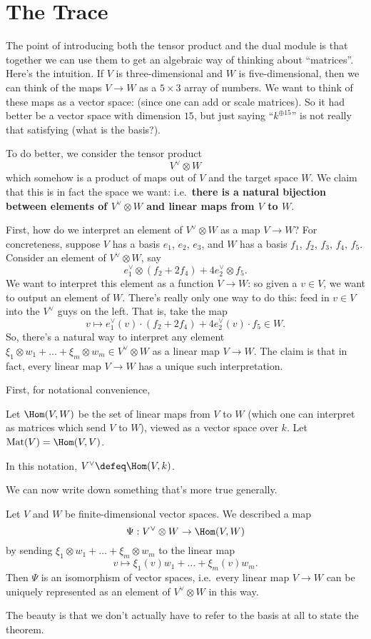 \section{The Trace}
The point of introducing both the tensor product and the dual module is that together
we can use them to get an algebraic way of thinking about ``matrices''.
Here's the intuition.
If $V$ is three-dimensional and $W$ is five-dimensional, then we can think
of the maps $V \to W$ as a $5 \times 3$ array of numbers.
We want to think of these maps as a vector space:
(since one can add or scale matrices).
So it had better be a vector space with dimension $15$,
but just saying ``$k^{\oplus 15}$'' is not really that satisfying
(what is the basis?).

To do better, we consider the tensor product \[ V^\vee \otimes W \]
which somehow is a product of maps out of $V$ and the target space $W$.
We claim that this is in fact the space we want:
i.e.\ \textbf{there is a natural bijection between elements of $V^\vee \otimes W$
and linear maps from $V$ to $W$}.

First, how do we interpret an element of $V^\vee \otimes W$ as a map $V \to W$?
For concreteness, suppose $V$ has a basis $e_1$, $e_2$, $e_3$,
and $W$ has a basis $f_1$, $f_2$, $f_3$, $f_4$, $f_5$.
Consider an element of $V^\vee \otimes W$, say
\[ e_1^\vee \otimes (f_2 + 2f_4) + 4e_2^\vee \otimes f_5. \]
We want to interpret this element as a function $V \to W$:
so given a $v \in V$,
we want to output an element of $W$.
There's really only one way to do this:
feed in $v \in V$ into the $V^\vee$ guys on the left.
That is, take the map
\[ v \mapsto e_1^\vee(v) \cdot (f_2 + 2f_4) + 4e_2^\vee(v) \cdot f_5 \in W. \]
So, there's a natural way to interpret any element
$\xi_1 \otimes w_1 + \dots + \xi_m \otimes w_m \in V^\vee \otimes W$
as a linear map $V \to W$.
The claim is that in fact, every linear map $V \to W$ has a unique such interpretation.

First, for notational convenience,
\begin{definition}
	Let $\Hom(V,W)$ be the set of linear maps from $V$ to $W$
	(which one can interpret as matrices which send $V$ to $W$),
	viewed as a vector space over $k$.
	Let $\Mat(V) = \Hom(V,V)$.
\end{definition}
In this notation, $V^\vee \defeq \Hom(V,k)$.

We can now write down something that's more true generally.
\begin{theorem}
	Let $V$ and $W$ be finite-dimensional vector spaces.
	We described a map
	\[ \Psi : V^\vee \otimes W \to \Hom(V,W) \]
	by sending $\xi_1 \otimes w_1 + \dots + \xi_m \otimes w_m$ to the linear map
	\[ v \mapsto \xi_1(v) w_1 + \dots + \xi_m(v) w_m. \]
	Then $\Psi$ is an isomorphism of vector spaces, i.e.\ every linear map $V \to W$
	can be uniquely represented as an element of $V^\vee \otimes W$ in this way.
\end{theorem}
The beauty is that we don't actually have to refer to the basis at all to state the theorem.

